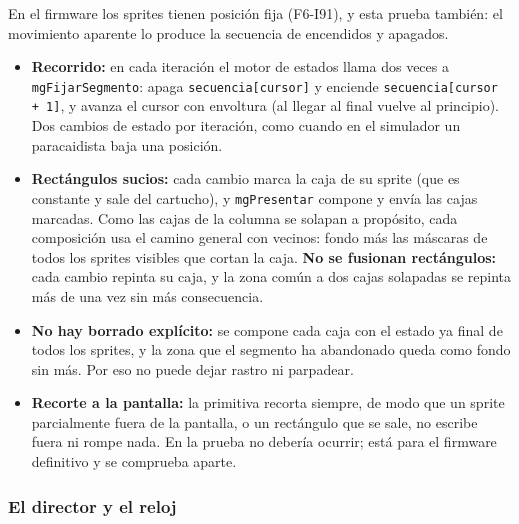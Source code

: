 En el firmware los sprites tienen posición fija (F6-I91), y esta prueba también: el movimiento aparente lo produce la secuencia de encendidos y apagados.

\begin{itemize}
	\item \textbf{Recorrido:} en cada iteración el motor de estados llama dos veces a \texttt{mgFijarSegmento}: apaga \texttt{secuencia[cursor]} y enciende \texttt{secuencia[cursor + 1]}, y avanza el cursor con envoltura (al llegar al final vuelve al principio). Dos cambios de estado por iteración, como cuando en el simulador un paracaidista baja una posición.
	\item \textbf{Rectángulos sucios:} cada cambio marca la caja de su sprite (que es constante y sale del cartucho), y \texttt{mgPresentar} compone y envía las cajas marcadas. Como las cajas de la columna se solapan a propósito, cada composición usa el camino general con vecinos: fondo más las máscaras de todos los sprites visibles que cortan la caja. \textbf{No se fusionan rectángulos:} cada cambio repinta su caja, y la zona común a dos cajas solapadas se repinta más de una vez sin más consecuencia.
	\item \textbf{No hay borrado explícito:} se compone cada caja con el estado ya final de todos los sprites, y la zona que el segmento ha abandonado queda como fondo sin más. Por eso no puede dejar rastro ni parpadear.
	\item \textbf{Recorte a la pantalla:} la primitiva recorta siempre, de modo que un sprite parcialmente fuera de la pantalla, o un rectángulo que se sale, no escribe fuera ni rompe nada. En la prueba no debería ocurrir; está para el firmware definitivo y se comprueba aparte.
\end{itemize}

\subsubsection{El director y el reloj}

